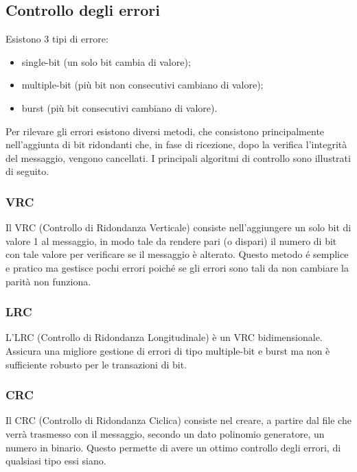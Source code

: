 \documentclass[a4paper, twoside]{article}
\def\sub#1{\subsection{#1}\label{#1}}
\def\subsub#1{\subsubsection{#1}\label{#1}}
\begin{document}
\sub{Controllo degli errori}
Esistono 3 tipi di errore:
\begin{itemize}
    \item single-bit (un solo bit cambia di valore);
    \item multiple-bit (più bit non consecutivi cambiano di valore);
    \item burst (più bit consecutivi cambiano di valore).
\end{itemize}
Per rilevare gli errori esistono diversi metodi, che consistono principalmente nell'aggiunta di bit ridondanti che, in fase di ricezione, dopo la verifica l'integrità del messaggio, vengono cancellati. I principali algoritmi di controllo sono illustrati di seguito.
\subsub{VRC}
Il VRC (Controllo di Ridondanza Verticale) consiste nell'aggiungere un solo bit di valore 1 al messaggio, in modo tale da rendere pari (o dispari) il numero di bit con tale valore per verificare se il messaggio è alterato. Questo metodo é semplice e pratico ma gestisce pochi errori poiché se gli errori sono tali da non cambiare la parità non funziona.
\subsub{LRC}
L'LRC (Controllo di Ridondanza Longitudinale) è un VRC bidimensionale.
Assicura una migliore gestione di errori di tipo multiple-bit e burst ma non è sufficiente robusto per le transazioni di bit. %
\subsub{CRC}
Il CRC (Controllo di Ridondanza Ciclica) consiste nel creare, a partire dal file che verrà trasmesso con il messaggio, secondo un dato polinomio generatore, un numero in binario. Questo permette di avere un ottimo controllo degli errori, di qualsiasi tipo essi siano.
\end{document}
